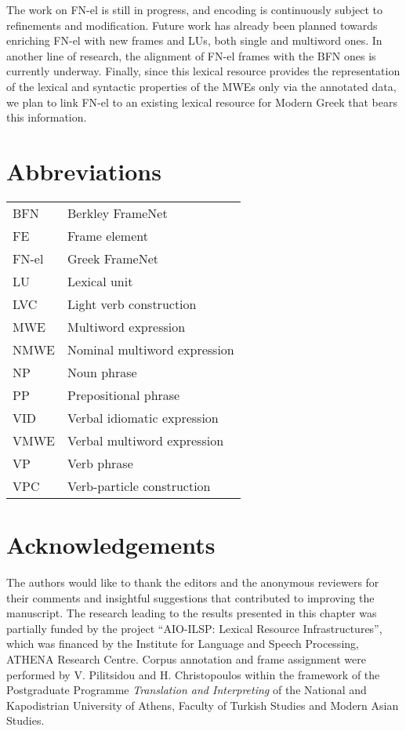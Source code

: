 \documentclass[output=paper,colorlinks,citecolor=brown]{langscibook}
\begin{document}
The work on FN-el is still in progress, and encoding is continuously subject to refinements and modification. Future work has already been planned towards enriching FN-el with new frames and LUs, both single and multiword ones. In another line of research, the alignment of FN-el frames with the BFN ones is currently underway. Finally, since this lexical resource provides the representation of the lexical and syntactic properties of the MWEs only via the annotated data, we plan to link FN-el to an existing lexical resource for Modern Greek that bears this information.


\section*{Abbreviations}
\begin{tabular}{@{}ll@{}}
BFN  & Berkley FrameNet\\
FE & Frame element\\
FN-el & Greek FrameNet \\
LU & Lexical unit\\
LVC & Light verb construction \\
MWE & Multiword expression\\
NMWE & Nominal multiword expression\\
NP & Noun phrase \\
PP & Prepositional phrase \\
VID & Verbal idiomatic expression \\
VMWE & Verbal multiword expression\\
VP & Verb phrase \\
VPC & Verb-particle construction\\
\end{tabular}


\section*{Acknowledgements}
The authors would like to thank the editors and the anonymous reviewers for their comments and insightful suggestions that contributed to improving the manuscript. The research leading to the results presented in this chapter was partially funded by the project “AIO-ILSP: Lexical Resource Infrastructures”, which was financed by the Institute for 
Language and Speech Processing, ATHENA Research Centre. Corpus annotation and frame assignment were performed by V. Pilitsidou and H. Christopoulos within the framework of the Postgraduate Programme \textit{Translation and Interpreting} of the National and Kapodistrian University of Athens, Faculty of Turkish Studies and Modern Asian Studies.

{\sloppy\printbibliography[heading=subbibliography,notkeyword=this]}
\end{document}
